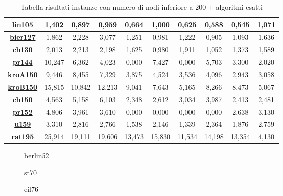 \documentclass[11pt]{article}
\begin{document}
\begin{table}
\begin{adjustbox}{center}
\begin{tabular}{|c|c|c|c|c|c|c|c|c|c|}
        \hline 
        \textbf{\hyperref[fig:lin105]{lin105}} & 1,402 & 0,897 & 0,959 & 0,664 & 1,000 & 0,625 & 0,588 & 0,545 & 1,071\tabularnewline
        \hline 
        \textbf{\hyperref[fig:bier127]{bier127}} & 1,862 & 2,228 & 3,077 & 1,251 & 0,981 & 1,222 & 0,905 & 1,093 & 1,636\tabularnewline
        \hline 
        \textbf{\hyperref[fig:ch130]{ch130}} & 2,013 & 2,213 & 2,198 & 1,625 & 0,980 & 1,911 & 1,052 & 1,373 & 1,589\tabularnewline
        \hline 
        \textbf{\hyperref[fig:pr144]{pr144}} & 10,247 & 6,362 & 4,023 & 0,000 & 7,427 & 0,000 & 5,703 & 3,300 & 2,020\tabularnewline
        \hline 
        \textbf{\hyperref[fig:kroA150]{kroA150}} & 9,446 & 8,455 & 7,329 & 3,875 & 4,524 & 3,536 & 4,096 & 2,943 & 3,058\tabularnewline
        \hline 
        \textbf{\hyperref[fig:kroB150]{kroB150}} & 15,815 & 10,842 & 12,213 & 9,041 & 7,643 & 5,165 & 8,266 & 8,473 & 5,067\tabularnewline
        \hline 
        \textbf{\hyperref[fig:ch150]{ch150}} & 4,563 & 5,158 & 6,103 & 2,348 & 2,612 & 3,034 & 3,987 & 2,413 & 2,481\tabularnewline
        \hline 
        \textbf{\hyperref[fig:pr152]{pr152}} & 4,806 & 3,961 & 3,610 & 0,000 & 0,000 & 0,000 & 0,000 & 2,638 & 3,130\tabularnewline
        \hline 
        \textbf{\hyperref[fig:u159]{u159}} & 3,310 & 2,816 & 2,766 & 1,538 & 2,146 & 1,339 & 2,364 & 1,876 & 2,759\tabularnewline
        \hline 
        \textbf{\hyperref[fig:rat195]{rat195}} & 25,914 & 19,111 & 19,606 & 13,473 & 15,830 & 11,534 & 14,198 & 13,354 & 4,130\tabularnewline
        \hline 
\end{tabular}
\end{adjustbox}
\caption{Tabella risultati instanze con numero di nodi inferiore a \textbf{$200$} $+$ algoritmi esatti}
\end{table}

\begin{figure}[htbp]
    \centering
    \label{fig:berlin52}
    \caption{berlin52}
\end{figure}

\begin{figure}[htbp]
    \centering
    \label{fig:st70}
    \caption{st70}
\end{figure}

\begin{figure}[htbp]
    \centering
    \label{fig:eil76}
    \caption{eil76}
\end{figure}
\end{document}
